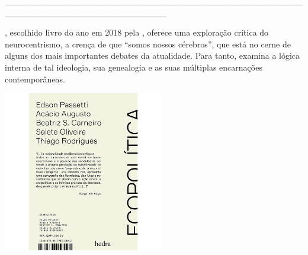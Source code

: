 \hspace*{-2cm}\_\_\_\_\_\_\_\_\_\_\_\_\_\_\_\_\_\_\_\_\_\_\_\_\_\_\_\_\_\_\_\_\_\_\_\_\_\_\_\_\_\_\_\_\_\_\_\_\_\_\_\_\_\_\_\_\_\_\_\_\_\_\_\_\_\_\_\_\_\_\_\_\_\_

\medskip

, escolhido livro do ano em 2018 pela {}, oferece uma exploração crítica do neurocentrismo, a crença de que “somos nossos cérebros”, que está no cerne de alguns dos mais importantes debates da atualidade. Para tanto, examina a lógica interna de tal ideologia, sua genealogia e as suas múltiplas encarnações contemporâneas.

\hspace{.5cm}

\hspace*{-.4cm}\begin{minipage}[c]{0.90\linewidth}
\small{
{}}
\end{minipage}

\pagebreak

\hspace{.5cm}

\begin{center}
\hspace*{-1cm}
\hspace{1cm}\includegraphics[width=70mm]{eco.jpeg}
\end{center}

